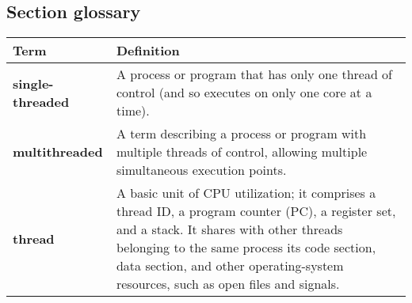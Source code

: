 \subsection*{Section glossary}
\centering
\begin{tabular}{>{\raggedright}p{} >{\raggedright\arraybackslash}p{}}
\toprule
\textbf{Term} & \textbf{Definition} \\
\midrule
\textbf{single-threaded} & A process or program that has only one thread of control (and so executes on only one core at a time). \\
\textbf{multithreaded} & A term describing a process or program with multiple threads of control, allowing multiple simultaneous execution points. \\
\textbf{thread} & A basic unit of CPU utilization; it comprises a thread ID, a program counter (PC), a register set, and a stack. It shares with other threads belonging to the same process its code section, data section, and other operating-system resources, such as open files and signals. \\
\bottomrule
\end{tabular}
\vspace{\baselineskip}
